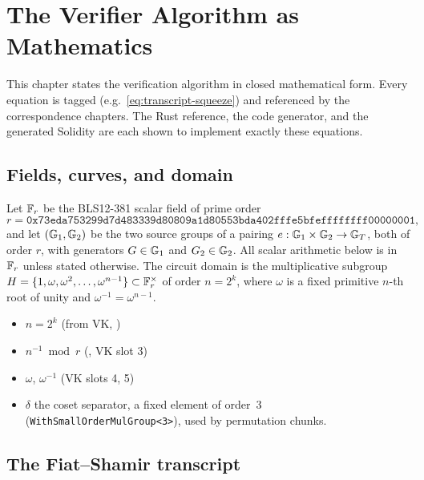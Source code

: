 \chapter{The Verifier Algorithm as Mathematics}
\label{ch:math}

This chapter states the verification algorithm in closed mathematical form.
Every equation is tagged (e.g.\ \eqref{eq:transcript-squeeze}) and referenced
by the correspondence chapters. The Rust reference, the code generator, and
the generated Solidity are each shown to implement exactly these equations.

\section{Fields, curves, and domain}
\label{sec:fields}

Let $\mathbb{F}_r$ be the BLS12-381 scalar field of prime order
\[
  r = \texttt{0x73eda753299d7d483339d80809a1d80553bda402fffe5bfeffffffff00000001},
\]
and let $(\mathbb{G}_1, \mathbb{G}_2)$ be the two source groups of a pairing
$e : \mathbb{G}_1 \times \mathbb{G}_2 \to \mathbb{G}_T$, both of order $r$, with generators
$G \in \mathbb{G}_1$ and $G_2 \in \mathbb{G}_2$. All scalar arithmetic below is in $\mathbb{F}_r$
unless stated otherwise. The circuit domain is the multiplicative subgroup
$H = \{1, \omega, \omega^2, \ldots, \omega^{n-1}\} \subset \mathbb{F}_r^\times$ of
order $n = 2^k$, where $\omega$ is a fixed primitive $n$-th root of unity
and $\omega^{-1} = \omega^{n-1}$.

\begin{itemize}[leftmargin=1.4em,itemsep=1pt]
  \item $n = 2^k$ \hfill (from VK, )
  \item $n^{-1} \bmod r$ \hfill (, VK slot 3)
  \item $\omega$, $\omega^{-1}$ \hfill (VK slots 4, 5)
  \item $\delta$ \hfill the coset separator, a fixed element of order~3
        (\texttt{WithSmallOrderMulGroup<3>}), used by permutation chunks.
\end{itemize}

\section{The Fiat--Shamir transcript}
\label{sec:transcript}

